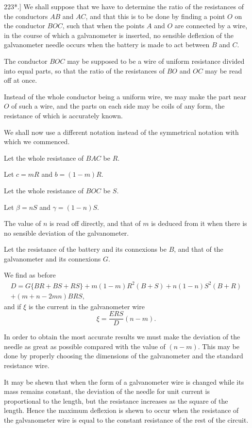 \documentclass[12pt,oneside]{book}[2021/10/04]
\newcommand{\article}[1]{\phantomsection \label{art:#1}{#1.]}}
\newcommand{\¬}{\hphantom{0}}
\begin{document}
\article{223*} We shall suppose that we have to determine the ratio of
the resistances of the conductors \(AB\) and \(AC\), and that this is to be
done by finding a point \(O\) on the conductor \(BOC\), such that when
the points \(A\) and \(O\) are connected by a wire, in the course of which
a galvanometer is inserted, no sensible deflexion of the galvanometer
needle occurs when the battery is made to act between \(B\)
and \(C\).

The conductor \(BOC\) may be supposed to be a wire of uniform
resistance divided into equal parts, so that the ratio of the resistances
of \(BO\) and \(OC\) may be read off at once.

Instead of the whole conductor being a uniform wire, we may
make the part near \(O\) of such a wire, and the parts on each side
may be coils of any form, the resistance of which is accurately
known.

We shall now use a different notation instead of the symmetrical
notation with which we commenced.

Let the whole resistance of \(BAC\) be \(R\).

Let \(c = mR\) and \(b = (1 - m)R\).

Let the whole resistance of \(BOC\) be \(S\).

Let \(\beta = nS\) and \(\gamma = (1 - n)S\).

The value of \(n\) is read off directly, and that of \(m\) is deduced from
it when there is no sensible deviation of the galvanometer.

Let the resistance of the battery and its connexions be \(B\), and
that of the galvanometer and its connexions \(G\).

We find as before
\begin{multline*}
D = G\{BR + BS + RS\} + m(1 - m)R^2(B + S) + n(1 - n)S^2(B + R)\\
+ (m + n - 2mn)BRS\text{,}
\end{multline*}
and if \(\xi\) is the current in the galvanometer wire
\[
\xi = \frac{ERS}{D}(n - m)\text{.}
\]

In order to obtain the most accurate results we must make the
deviation of the needle as great as possible compared with the
value of \((n - m)\). This may be done by properly choosing the
dimensions of the galvanometer and the standard resistance wire.

It may be shewn that when the form of a galvanometer wire
is changed while its mass remains constant, the deviation of the
needle for unit current is proportional to the length, but the
resistance increases as the square of the length. Hence the
maximum deflexion is shewn to occur when the resistance of the
galvanometer wire is equal to the constant resistance of the rest
of the circuit.
\end{document}
